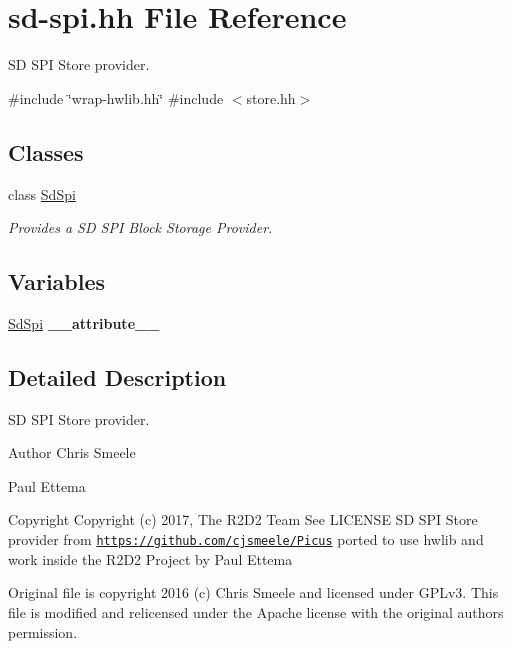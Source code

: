 \hypertarget{sd-spi_8hh}{}\section{sd-\/spi.hh File Reference}
\label{sd-spi_8hh}


SD S\+PI Store provider.  


{\ttfamily \#include \char`\"{}wrap-\/hwlib.\+hh\char`\"{}}\newline
{\ttfamily \#include $<$store.\+hh$>$}\newline
\subsection*{Classes}
\begin{DoxyCompactItemize}
\item 
class \hyperlink{class_sd_spi}{Sd\+Spi}
\begin{DoxyCompactList}\small\item\em Provides a SD S\+PI Block Storage Provider. \end{DoxyCompactList}\end{DoxyCompactItemize}
\subsection*{Variables}
\begin{DoxyCompactItemize}
\item 
\mbox{\label{sd-spi_8hh_ac74ade0daa8170c6112d3540d621e598}} 
\hyperlink{class_sd_spi}{Sd\+Spi} {\bfseries \+\_\+\+\_\+attribute\+\_\+\+\_\+}
\end{DoxyCompactItemize}


\subsection{Detailed Description}
SD S\+PI Store provider. 

\begin{DoxyAuthor}{Author}
Chris Smeele 

Paul Ettema 
\end{DoxyAuthor}
\begin{DoxyCopyright}{Copyright}
Copyright (c) 2017, The R2\+D2 Team  See L\+I\+C\+E\+N\+SE SD S\+PI Store provider from \href{https://github.com/cjsmeele/Picus}{\tt https\+://github.\+com/cjsmeele/\+Picus} ported to use hwlib and work inside the R2\+D2 Project by Paul Ettema
\end{DoxyCopyright}
Original file is copyright 2016 (c) Chris Smeele and licensed under G\+P\+Lv3. This file is modified and relicensed under the Apache license with the original author\textquotesingle{}s permission. 